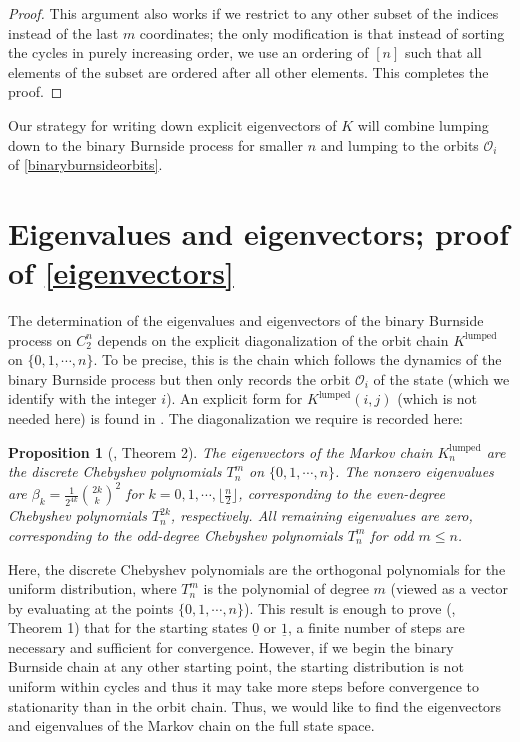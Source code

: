 \documentclass[11pt]{article}
\newcommand{\mc}{\mathcal}
\newcounter{r}
\newcounter{s}
\numberwithin{equation}{section}
\newtheorem{proposition}[theorem]{Proposition}
\begin{document}
\begin{proof}
This argument also works if we restrict to any other subset of the indices instead of the last $m$ coordinates; the only modification is that instead of sorting the cycles in purely increasing order, we use an ordering of $[n]$ such that all elements of the subset are ordered after all other elements. This completes the proof.
\end{proof}

Our strategy for writing down explicit eigenvectors of $K$ will combine lumping down to the binary Burnside process for smaller $n$ and lumping to the orbits $\mc{O}_i$ of \cref{binaryburnsideorbits}.

\section{Eigenvalues and eigenvectors; proof of \cref{eigenvectors}}\label{eigenvectorsection}

The determination of the eigenvalues and eigenvectors of the binary Burnside process on $C_2^n$ depends on the explicit diagonalization of the orbit chain $K^{\text{lumped}}$ on $\{0, 1, \cdots, n\}$. To be precise, this is the chain which follows the dynamics of the binary Burnside process but then only records the orbit $\mc{O}_i$ of the state (which we identify with the integer $i$). An explicit form for $K^{\text{lumped}}(i, j)$ (which is not needed here) is found in \cite[Eqn.(3.1)-(3.3)]{boseeinstein}. The diagonalization we require is recorded here:

\begin{proposition}[\cite{diaconiszhong}, Theorem 2]\label{lumpedeigenvalues}
The eigenvectors of the Markov chain $K^{\text{lumped}}_n$ are the discrete Chebyshev polynomials $T_n^m$ on $\{0, 1, \cdots, n\}$. The nonzero eigenvalues are $\beta_k = \frac{1}{2^{4k}} \binom{2k}{k}^2$ for $k = 0, 1, \cdots, \lfloor \frac{n}{2} \rfloor$, corresponding to the even-degree Chebyshev polynomials $T_n^{2k}$, respectively. All remaining eigenvalues are zero, corresponding to the odd-degree Chebyshev polynomials $T_n^m$ for odd $m \le n$.
\end{proposition}

Here, the discrete Chebyshev polynomials are the orthogonal polynomials for the uniform distribution, where $T_n^m$ is the polynomial of degree $m$ (viewed as a vector by evaluating at the points $\{0, 1, \cdots, n\}$). This result is enough to prove (\cite{diaconiszhong}, Theorem 1) that for the starting states $\underline{0}$ or $\underline{1}$, a finite number of steps are necessary and sufficient for convergence. However, if we begin the binary Burnside chain at any other starting point, the starting distribution is not uniform within cycles and thus it may take more steps before convergence to stationarity than in the orbit chain. Thus, we would like to find the eigenvectors and eigenvalues of the Markov chain on the full state space.
\end{document}
